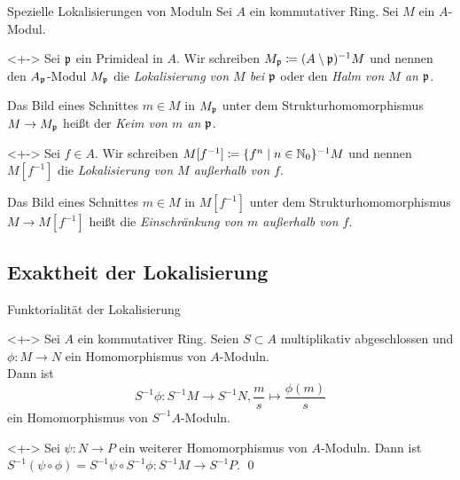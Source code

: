 \begin{frame}{Spezielle Lokalisierungen von Moduln}
	Sei \(A\) ein kommutativer Ring. Sei \(M\) ein \(A\)-Modul. 
	\begin{notation}<+->
		Sei \(\mathfrak{p}\) ein Primideal in \(A\).
		Wir schreiben \(M_{\mathfrak{p}} \coloneqq (A \setminus \mathfrak{p})^{-1} M\) und nennen den \(A_{\mathfrak{p}}\)-Modul
		\(M_{\mathfrak{p}}\) die \emph{Lokalisierung von \(M\) bei \(\mathfrak{p}\)} oder den \emph{Halm von \(M\)
		an \(\mathfrak{p}\)}.

		Das Bild eines Schnittes \(m \in M\) in \(M_{\mathfrak{p}}\) unter dem Strukturhomomorphismus \(M \to M_{\mathfrak{p}}\)
		heißt der \emph{Keim von \(m\) an \(\mathfrak{p}\)}.
	\end{notation}
	\begin{notation}<+->
		Sei \(f \in A\). Wir schreiben \(M[f^{-1}] \coloneqq \{f^n \mid n \in \mathbb N_0\}^{-1} M\) und nennen
		\(M[f^{-1}]\) die \emph{Lokalisierung von \(M\) außerhalb von \(f\)}.
		
		Das Bild eines Schnittes \(m \in M\) in \(M[f^{-1}]\) unter dem Strukturhomomorphismus \(M \to M[f^{-1}]\)
		heißt die \emph{Einschränkung von \(m\) außerhalb von \(f\)}.
	\end{notation}
\end{frame}

\subsection{Exaktheit der Lokalisierung}

\begin{frame}{Funktorialität der Lokalisierung}
	\begin{visibleenv}<+->
		Sei \(A\) ein kommutativer Ring. Seien \(S \subset A\) multiplikativ abgeschlossen und \(\phi\colon M \to N\)
		ein Homomorphismus von \(A\)-Moduln.
		\\
		Dann ist
		\[
			S^{-1}\phi\colon S^{-1} M \to S^{-1} N, \frac m s \mapsto \frac{\phi(m)} s
		\]
		ein Homomorphismus von \(S^{-1} A\)-Moduln.
	\end{visibleenv}
	\begin{proposition}<+->
		Sei \(\psi\colon N \to P\) ein weiterer Homomorphismus von \(A\)-Moduln. Dann ist
		\(S^{-1} (\psi \circ \phi) = S^{-1} \psi \circ S^{-1} \phi\colon S^{-1} M \to S^{-1} P\).
		\qed
	\end{proposition}
\end{frame}

